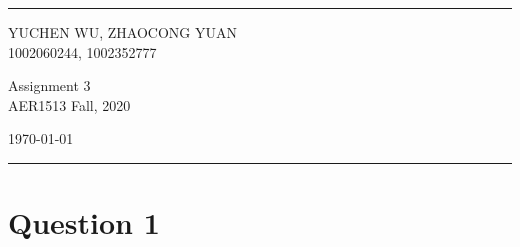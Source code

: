 \documentclass[a4paper]{article}
\begin{document}

\fancyhead[C]{}
\hrule \medskip %
\begin{minipage}{0.295\textwidth} 
\raggedright
\footnotesize
YUCHEN WU, ZHAOCONG YUAN\hfill\\   
1002060244, 1002352777\hfill\\
\end{minipage}
\begin{minipage}{0.4\textwidth} 
\centering 
\large 
Assignment 3\\ 
\normalsize 
AER1513 Fall, 2020\\ 
\end{minipage}
\begin{minipage}{0.295\textwidth} 
\raggedleft
\today\hfill\\
\end{minipage}
\medskip\hrule 
\bigskip


\newcommand{\vect}[1]{\bm{\mathbf{#1}}}
\newcommand{\mat}[1]{\bm{\mathbf{#1}}}

\section*{Question 1} 
\end{document}
